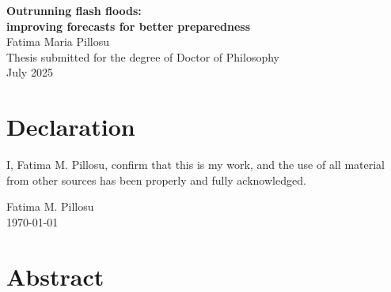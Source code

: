 \documentclass{thesis} %
\begin{document}
\begin{titlepage}
\begin{center}
        {\huge\bfseries Outrunning flash floods:\\
        improving forecasts for better preparedness}\\[1cm]
        
        {\Large Fatima Maria Pillosu}\\[5.5cm]
        
        {\Large  Thesis submitted for the degree of Doctor of Philosophy}\\[0.2cm]
        {\Large  July 2025}
    \end{center}
\end{titlepage}


\thispagestyle{empty} %

\newpage
\null
\newpage
\setcounter{page}{1} %

\chapter*{\Large Declaration}

I, Fatima M. Pillosu, confirm that this is my work, and the use of all material from other sources has been properly and fully acknowledged. \\[1cm]

\begin{flushright}
Fatima M. Pillosu \\
\today
\end{flushright}

\newpage
\null
\newpage
\setcounter{page}{3} %

\chapter*{\Large Abstract}
\end{document}
